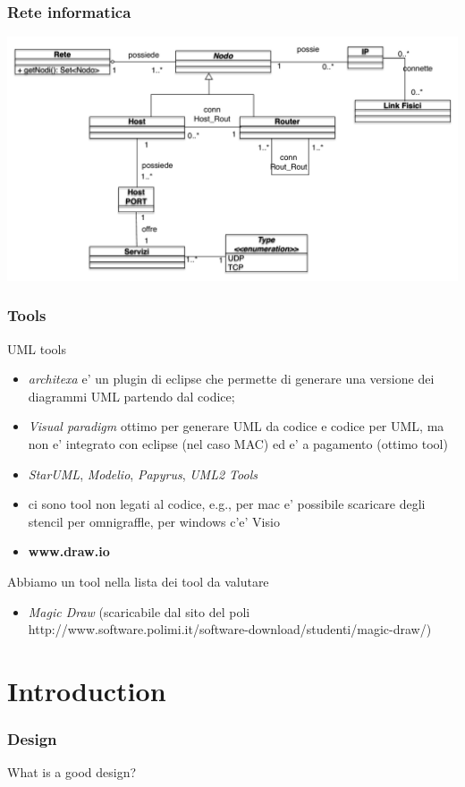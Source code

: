 \documentclass{beamer}
\begin{document}
\begin{frame}
\frametitle{Rete informatica}
\includegraphics[scale=0.4]{Img/inf.pdf}
\end{frame}


\begin{frame}
\frametitle{Tools}
UML tools
\begin{framed}
\begin{itemize}
\item	\emph{architexa} e’ un plugin di eclipse che permette di generare una versione dei diagrammi UML partendo dal codice;
\item	\emph{Visual paradigm} ottimo per generare UML da codice e codice per UML, ma non e’ integrato con eclipse (nel caso MAC) ed e' a pagamento (ottimo tool)
\item  \emph{StarUML}, \emph{Modelio},  \emph{Papyrus},  \emph{UML2 Tools}
\item	ci sono tool non legati al codice, e.g., per mac e’ possibile scaricare degli stencil per omnigraffle, per windows c’e’ Visio
\item \textbf{www.draw.io}
\end{itemize}

Abbiamo un tool nella lista dei tool da valutare
\begin{itemize}
\item \emph{Magic Draw} (scaricabile dal sito del poli http://www.software.polimi.it/software-download/studenti/magic-draw/)
\end{itemize} 
\end{framed}
\end{frame}


\section{Introduction}
\begin{frame}
\frametitle{Design}
What is a good design?
\end{frame}
\end{document}
